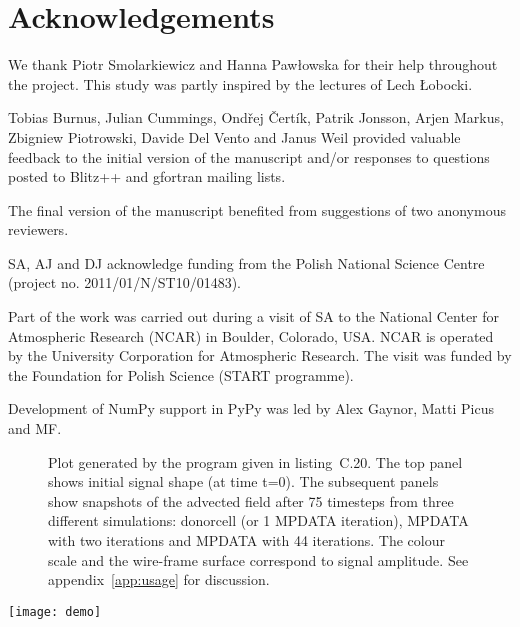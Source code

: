 \documentclass[twocolumn]{article}
\newcommand{\changed}[1]{#1}
\begin{document}
  \footnotesize

  \section*{Acknowledgements}
  {
    We thank Piotr Smolarkiewicz and Hanna Pawłowska for their help throughout the project.
    This study was partly inspired by the lectures of Lech Łobocki.

    Tobias Burnus, Julian Cummings, Ond\v{r}ej \v{C}ert\'ik, Patrik Jonsson,
      Arjen Markus, Zbigniew Piotrowski, Davide Del Vento and Janus Weil 
      provided valuable feedback to the initial version of the
      manuscript and/or responses to questions posted to Blitz++ and gfortran mailing lists.

    \changed{The final version of the manuscript benefited from suggestions of two
      anonymous reviewers.}
    
    SA, AJ and DJ acknowledge funding from the Polish National Science Centre
      (project no. 2011/01/N/ST10/01483).

    Part of the work was carried out during a visit of SA to the National
      Center for Atmospheric Research (NCAR) in Boulder, Colorado, USA.
    NCAR is operated by the University Corporation for Atmospheric Research.
    The visit was funded by the Foundation for Polish Science (START programme).
 
    Development of NumPy support in PyPy was led by Alex Gaynor, Matti Picus and MF.
  }

  
  
  
  \begin{figure}[bh!]
    \caption{\label{fig:mpdata}
      Plot generated by the program given in listing~C.20.
      The top panel shows initial signal shape (at time t=0).
      The subsequent panels show snapshots of the advected field after 75 timesteps
        from three different simulations: donorcell (or 1 MPDATA iteration), MPDATA
        with two iterations and MPDATA with 44 iterations.
      The colour scale and the wire-frame surface correspond to signal amplitude.
      See appendix~\ref{app:usage} for discussion.
    }
  \end{figure}
  \begin{center}
    \texttt{[image: demo]}
  \end{center}
\end{document}
